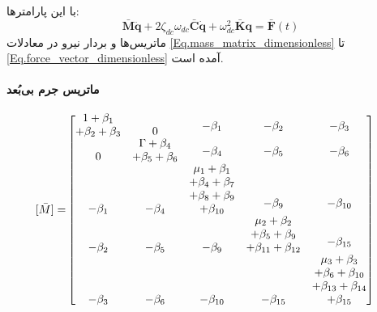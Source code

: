 با این پارامترها:
\begin{equation}\label{Eq.EOM_dimensionless}
\mathbf{\bar{M}} \ddot{\mathbf{q}} + 2 
\zeta_{dc} \omega_{dc} \mathbf{\bar{C}} \dot{\mathbf{q}} + \omega_{dc}^2 \mathbf{\bar{K}} \mathbf{q} = \mathbf{\bar{F}}(t)
\end{equation}
ماتریس‌ها و بردار نیرو در معادلات \eqref{Eq.mass_matrix_dimensionless} تا \eqref{Eq.force_vector_dimensionless} آمده است.

\paragraph{ماتریس جرم بی‌بُعد}
\begin{equation}\label{Eq.mass_matrix_dimensionless}
\begin{aligned}
[\bar{M}] = & 
\begin{bmatrix}
\shortstack{$1 + \beta_1$ \\ $+ \beta_2 + \beta_3$} & 0 & \shortstack{$-\beta_1$ \\ \,} & \shortstack{$-\beta_2$ \\ \,} & \shortstack{$-\beta_3$ \\ \,} \\
0 & \shortstack{$\Gamma + \beta_4$ \\ $+ \beta_5 + \beta_6$} & \shortstack{$-\beta_4$ \\ \,} & \shortstack{$-\beta_5$ \\ \,} & \shortstack{$-\beta_6$ \\ \,} \\
-\beta_1 & -\beta_4 & \shortstack{$\mu_1 + \beta_1$ \\ $+ \beta_4 + \beta_7$ \\ $+ \beta_8 + \beta_9$ \\ $+ \beta_{10}$} & \shortstack{$-\beta_9$ \\ \,} & \shortstack{$-\beta_{10}$ \\ \,} \\
-\beta_2 & -\beta_5 & -\beta_9 & \shortstack{$\mu_2 + \beta_2$ \\ $+ \beta_5 + \beta_9$ \\ $+ \beta_{11} + \beta_{12}$} & \shortstack{$-\beta_{15}$ \\ \,} \\
-\beta_3 & -\beta_6 & -\beta_{10} & -\beta_{15} & \shortstack{$\mu_3 + \beta_3$ \\ $+ \beta_6 + \beta_{10}$ \\ $+ \beta_{13} + \beta_{14}$ \\ $+ \beta_{15}$}
\end{bmatrix}
\end{aligned}
\end{equation}

